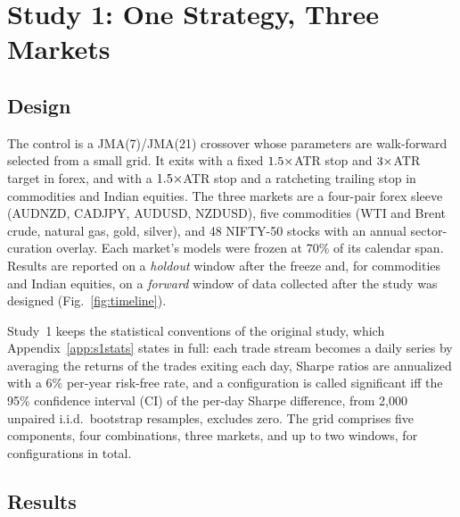 \section{Study 1: One Strategy, Three Markets}
\label{sec:study1}

\subsection{Design}

The control is a JMA(7)/JMA(21) crossover whose parameters are walk-forward selected from a small grid. It exits with
a fixed $1.5\times$ATR stop and $3\times$ATR target in forex, and with a $1.5\times$ATR stop and a
ratcheting trailing stop in commodities and Indian equities. The three markets are a four-pair forex sleeve (AUDNZD,
CADJPY, AUDUSD, NZDUSD), five commodities (WTI and Brent crude, natural gas, gold, silver), and 48 NIFTY-50 stocks
with an annual sector-curation overlay. Each market's models were frozen at 70\% of its calendar span. Results are
reported on a \emph{holdout} window after the freeze and, for commodities and Indian equities, on a \emph{forward}
window of data collected after the study was designed (Fig.~\ref{fig:timeline}).

Study~1 keeps the statistical conventions of the original study, which Appendix~\ref{app:s1stats} states in full:
each trade stream becomes a daily series by averaging the returns of the trades exiting each day, Sharpe ratios are
annualized with a 6\% per-year risk-free rate, and a configuration is called significant iff the 95\% confidence
interval (CI) of the per-day Sharpe difference, from 2{,}000 unpaired i.i.d.\ bootstrap resamples, excludes zero.
The grid comprises five components, four combinations, three markets, and up to two windows, for \SoneConfigs{}
configurations in total.

\subsection{Results}

